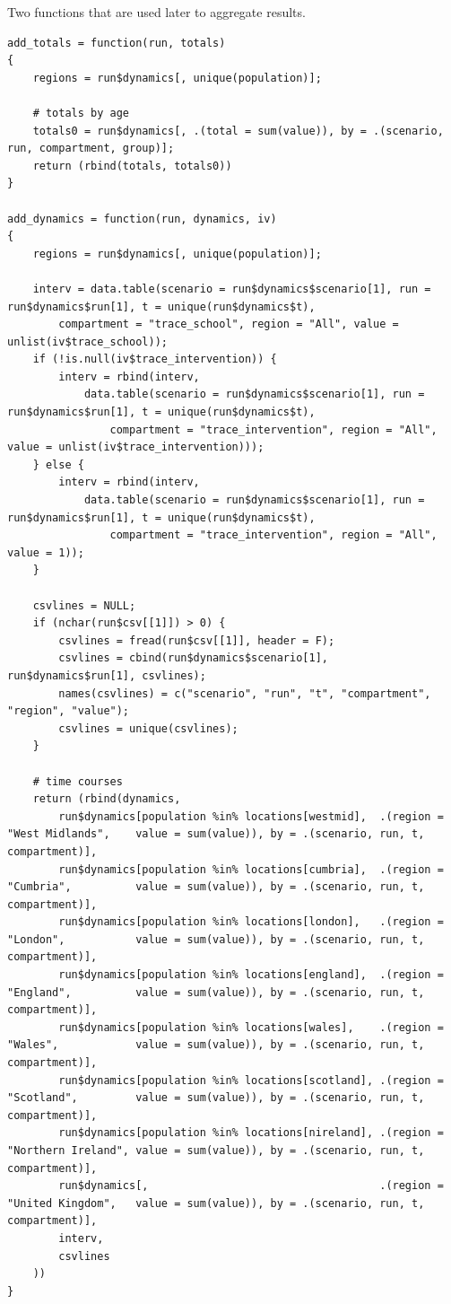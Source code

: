 \documentclass[11pt]{article}
\begin{document}
Two functions that are used later to aggregate results.

\begin{verbatim}
add_totals = function(run, totals)
{
    regions = run$dynamics[, unique(population)];

    # totals by age
    totals0 = run$dynamics[, .(total = sum(value)), by = .(scenario, run, compartment, group)];
    return (rbind(totals, totals0))
}

add_dynamics = function(run, dynamics, iv)
{
    regions = run$dynamics[, unique(population)];

    interv = data.table(scenario = run$dynamics$scenario[1], run = run$dynamics$run[1], t = unique(run$dynamics$t),
        compartment = "trace_school", region = "All", value = unlist(iv$trace_school));
    if (!is.null(iv$trace_intervention)) {
        interv = rbind(interv,
            data.table(scenario = run$dynamics$scenario[1], run = run$dynamics$run[1], t = unique(run$dynamics$t),
                compartment = "trace_intervention", region = "All", value = unlist(iv$trace_intervention)));
    } else {
        interv = rbind(interv,
            data.table(scenario = run$dynamics$scenario[1], run = run$dynamics$run[1], t = unique(run$dynamics$t),
                compartment = "trace_intervention", region = "All", value = 1));
    }

    csvlines = NULL;
    if (nchar(run$csv[[1]]) > 0) {
        csvlines = fread(run$csv[[1]], header = F);
        csvlines = cbind(run$dynamics$scenario[1], run$dynamics$run[1], csvlines);
        names(csvlines) = c("scenario", "run", "t", "compartment", "region", "value");
        csvlines = unique(csvlines);
    }

    # time courses
    return (rbind(dynamics,
        run$dynamics[population %in% locations[westmid],  .(region = "West Midlands",    value = sum(value)), by = .(scenario, run, t, compartment)],
        run$dynamics[population %in% locations[cumbria],  .(region = "Cumbria",          value = sum(value)), by = .(scenario, run, t, compartment)],
        run$dynamics[population %in% locations[london],   .(region = "London",           value = sum(value)), by = .(scenario, run, t, compartment)],
        run$dynamics[population %in% locations[england],  .(region = "England",          value = sum(value)), by = .(scenario, run, t, compartment)],
        run$dynamics[population %in% locations[wales],    .(region = "Wales",            value = sum(value)), by = .(scenario, run, t, compartment)],
        run$dynamics[population %in% locations[scotland], .(region = "Scotland",         value = sum(value)), by = .(scenario, run, t, compartment)],
        run$dynamics[population %in% locations[nireland], .(region = "Northern Ireland", value = sum(value)), by = .(scenario, run, t, compartment)],
        run$dynamics[,                                    .(region = "United Kingdom",   value = sum(value)), by = .(scenario, run, t, compartment)],
        interv,
        csvlines
    ))
}
\end{verbatim}
\end{document}
